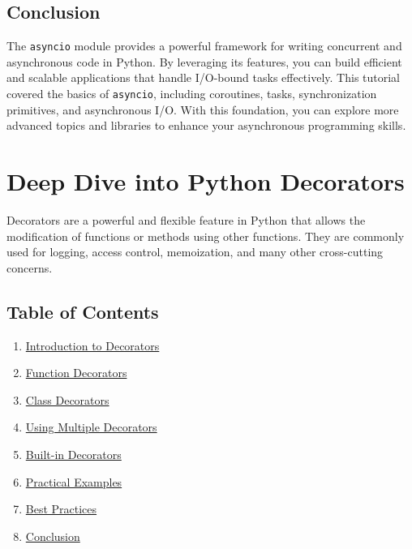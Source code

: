 \documentclass[
  letterpaper,
  DIV=11,
  numbers=noendperiod]{scrreprt}
\providecommand{\tightlist}{%
  \setlength{\itemsep}{0pt}\setlength{\parskip}{0pt}}\usepackage{longtable,booktabs,array}
\begin{document}
\section{Conclusion}\label{conclusion-34}

The \texttt{asyncio} module provides a powerful framework for writing
concurrent and asynchronous code in Python. By leveraging its features,
you can build efficient and scalable applications that handle I/O-bound
tasks effectively. This tutorial covered the basics of \texttt{asyncio},
including coroutines, tasks, synchronization primitives, and
asynchronous I/O. With this foundation, you can explore more advanced
topics and libraries to enhance your asynchronous programming skills.


\chapter{Deep Dive into Python
Decorators}\label{deep-dive-into-python-decorators}

Decorators are a powerful and flexible feature in Python that allows the
modification of functions or methods using other functions. They are
commonly used for logging, access control, memoization, and many other
cross-cutting concerns.

\section{Table of Contents}\label{table-of-contents-11}

\begin{enumerate}
\def\labelenumi{\arabic{enumi}.}
\tightlist
\item
  \hyperref[introduction-to-decorators]{Introduction to Decorators}
\item
  \hyperref[function-decorators]{Function Decorators}
\item
  \hyperref[class-decorators]{Class Decorators}
\item
  \hyperref[using-multiple-decorators]{Using Multiple Decorators}
\item
  \hyperref[built-in-decorators]{Built-in Decorators}
\item
  \hyperref[practical-examples]{Practical Examples}
\item
  \hyperref[best-practices]{Best Practices}
\item
  \hyperref[conclusion]{Conclusion}
\end{enumerate}
\end{document}
